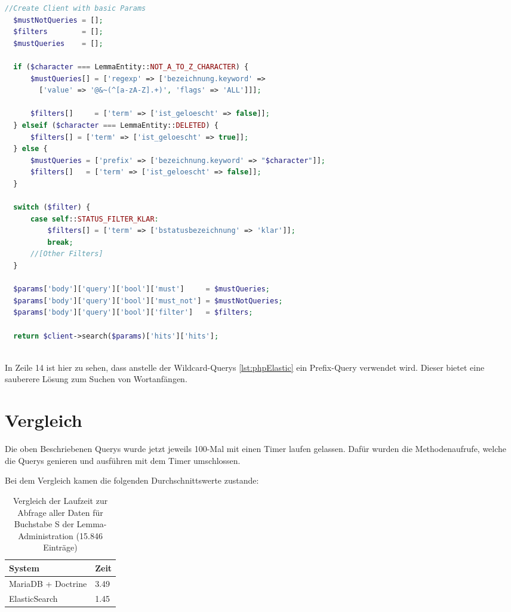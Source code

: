 \begin{lstlisting}[language=PHP, frame=single, label={lst:queryEla}] 
  //Create Client with basic Params
  $mustNotQueries = [];
  $filters        = [];
  $mustQueries    = [];

  if ($character === LemmaEntity::NOT_A_TO_Z_CHARACTER) {
      $mustQueries[] = ['regexp' => ['bezeichnung.keyword' => 
        ['value' => '@&~(^[a-zA-Z].+)', 'flags' => 'ALL']]];
        
      $filters[]     = ['term' => ['ist_geloescht' => false]];
  } elseif ($character === LemmaEntity::DELETED) {
      $filters[] = ['term' => ['ist_geloescht' => true]];
  } else {
      $mustQueries = ['prefix' => ['bezeichnung.keyword' => "$character"]];
      $filters[]   = ['term' => ['ist_geloescht' => false]];
  }

  switch ($filter) {
      case self::STATUS_FILTER_KLAR:
          $filters[] = ['term' => ['bstatusbezeichnung' => 'klar']];
          break;
      //[Other Filters]
  }

  $params['body']['query']['bool']['must']     = $mustQueries;
  $params['body']['query']['bool']['must_not'] = $mustNotQueries;
  $params['body']['query']['bool']['filter']   = $filters;

  return $client->search($params)['hits']['hits'];
  
\end{lstlisting}

In Zeile 14 ist hier zu sehen, dass anstelle der Wildcard-Querys \ref{lst:phpElastic} ein Prefix-Query verwendet wird. Dieser bietet eine sauberere Lösung zum Suchen von Wortanfängen.

\section{Vergleich}

Die oben Beschriebenen Querys wurde jetzt jeweils 100-Mal mit einen Timer laufen gelassen. 
Dafür wurden die Methodenaufrufe, welche die Querys genieren und ausführen mit dem Timer umschlossen. 

Bei dem Vergleich kamen die folgenden Durchschnittswerte zustande:
\begin{table} %
	\centering
		\begin{tabular}{l | l }
		    \textbf{System} & \textbf{Zeit} \\
        \hline
        MariaDB + Doctrine & 3.49 \\
        ElasticSearch      & 1.45  \\
		\end{tabular}
    \caption{Vergleich der Laufzeit zur Abfrage aller Daten für Buchstabe S der Lemma-Administration (15.846 Einträge)}
    \label{vlgTimeDBvsEla}
\end{table}

